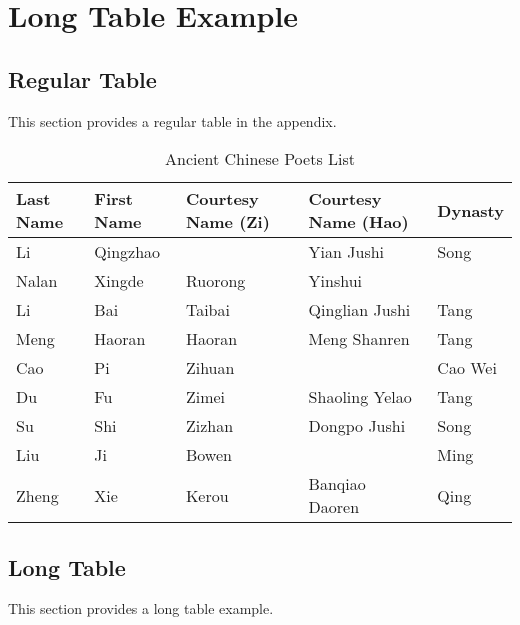 

\chapter{Long Table Example}
\label{chap:appendix_long_table_exp}

\section{Regular Table}
\label{sec:appendix_long_table_exp:regular_table}

This section provides a regular table in the appendix.

\begin{table}[h]
	\centering
	\caption{Ancient Chinese Poets List}
	\begin{tabular}{|p{2cm}|p{2cm}|p{1.8cm}|p{2.8cm}|p{1.8cm}|}
		\toprule
		Last Name & First Name & Courtesy Name (Zi) & Courtesy Name (Hao) & Dynasty \\
		\midrule
		Li & Qingzhao & & Yian Jushi & Song\\
		Nalan & Xingde & Ruorong & Yinshui \\
		Li & Bai & Taibai & Qinglian Jushi & Tang \\
		Meng & Haoran & Haoran & Meng Shanren & Tang \\
		Cao & Pi & Zihuan & & Cao Wei \\
		Du & Fu & Zimei & Shaoling Yelao & Tang \\
		Su & Shi & Zizhan & Dongpo Jushi & Song \\
		Liu & Ji & Bowen & & Ming \\
		Zheng & Xie & Kerou & Banqiao Daoren & Qing \\
		\bottomrule
	\end{tabular}
\end{table}

\section{Long Table}
\label{sec:appendix_long_table_exp:long_table}

This section provides a long table example.


